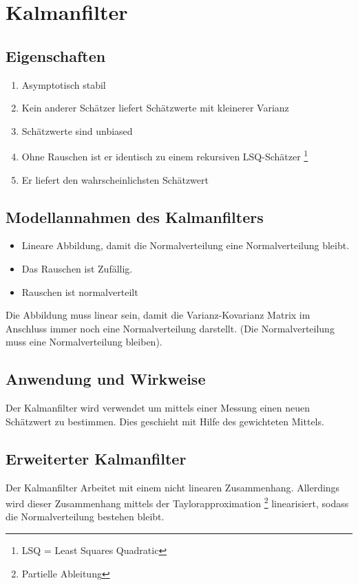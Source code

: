 \chapter{Kalmanfilter}
\label{chp:kalmanfilter}

\section{Eigenschaften}
\begin{enumerate}
	\item Asymptotisch stabil
	\item Kein anderer Schätzer liefert Schätzwerte mit kleinerer Varianz
	\item Schätzwerte sind unbiased
	\item Ohne Rauschen ist er identisch zu einem rekursiven LSQ-Schätzer \footnote{LSQ = 	Least Squares Quadratic}
	\item Er liefert den wahrscheinlichsten Schätzwert 
\end{enumerate}

\section{Modellannahmen des Kalmanfilters}
\begin{itemize}
	\item Lineare Abbildung, damit die Normalverteilung eine Normalverteilung bleibt.
	\item Das Rauschen ist Zufällig.
	\item Rauschen ist normalverteilt
\end{itemize}

Die Abbildung muss linear sein, damit die Varianz-Kovarianz Matrix im Anschluss immer noch eine Normalverteilung darstellt. (Die Normalverteilung muss eine Normalverteilung bleiben).

\section{Anwendung und Wirkweise}
Der Kalmanfilter wird verwendet um mittels einer Messung einen neuen Schätzwert zu bestimmen. Dies geschieht mit Hilfe des gewichteten Mittels.

\section{Erweiterter Kalmanfilter}
Der Kalmanfilter Arbeitet mit einem nicht linearen Zusammenhang. Allerdings wird dieser Zusammenhang mittels der Taylorapproximation \footnote{Partielle Ableitung} linearisiert, sodass die Normalverteilung bestehen bleibt.

